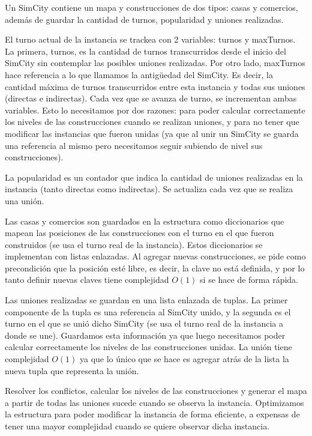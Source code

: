 \begin{Representacion}

Un SimCity contiene un mapa y construcciones de dos tipos: casas y comercios, además de guardar la cantidad de turnos, popularidad y uniones realizadas.

El turno actual de la instancia se trackea con 2 variables: turnos y maxTurnos. La primera, turnos, es la cantidad de turnos transcurridos desde el inicio del SimCity sin contemplar las posibles uniones realizadas. Por otro lado, maxTurnos hace referencia a lo que llamamos la antigüedad del SimCity. Es decir, la cantidad máxima de turnos transcurridos entre esta instancia y todas sus uniones (directas e indirectas). Cada vez que se avanza de turno, se incrementan ambas variables. Esto lo necesitamos por dos razones: para poder calcular correctamente los niveles de las construcciones cuando se realizan uniones, y para no tener que modificar las instancias que fueron unidas (ya que al unir un SimCity se guarda una referencia al mismo pero necesitamos seguir subiendo de nivel sus construcciones).

La popularidad es un contador que indica la cantidad de uniones realizadas en la instancia (tanto directas como indirectas). Se actualiza cada vez que se realiza una unión.

Las casas y comercios son guardados en la estructura como diccionarios que mapean las posiciones de las construcciones con el turno en el que fueron construidos (se usa el turno real de la instancia). Estos diccionarios se implementan con listas enlazadas. Al agregar nuevas construcciones, se pide como precondición que la posición esté libre, es decir, la clave no está definida, y por lo tanto definir nuevas claves tiene complejidad $O(1)$ si se hace de forma rápida.

Las uniones realizadas se guardan en una lista enlazada de tuplas. La primer componente de la tupla es una referencia al SimCity unido, y la segunda es el turno en el que se unió dicho SimCity (se usa el turno real de la instancia a donde se une). Guardamos esta información ya que luego necesitamos poder calcular correctamente los niveles de las construcciones unidas. La unión tiene complejidad $O(1)$ ya que lo único que se hace es agregar atrás de la lista la nueva tupla que representa la unión.

Resolver los conflictos, calcular los niveles de las construcciones y generar el mapa a partir de todas las uniones sucede cuando se observa la instancia. Optimizamos la estructura para poder modificar la instancia de forma eficiente, a expensas de tener una mayor complejidad cuando se quiere observar dicha instancia.


\end{Representacion}
